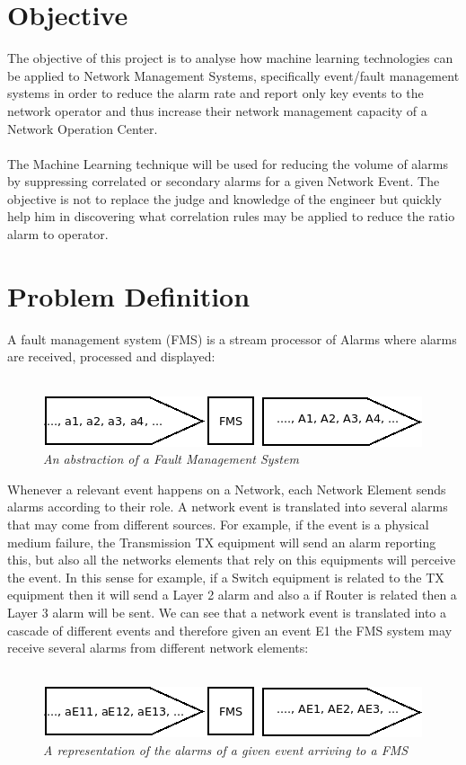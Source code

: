 \documentclass[10pt,a4paper]{article}
\begin{document}
 \section{Objective}
The objective of this project is to analyse how machine learning technologies can be applied to Network Management Systems, specifically event/fault management systems in order to reduce the alarm rate and report only key events to the network operator and thus increase their network management capacity of a Network Operation Center.
\\\\
The Machine Learning technique will be used for reducing the volume of alarms by suppressing correlated or secondary alarms for a given Network Event. The objective is not to replace the judge and knowledge of the engineer but quickly 
help him in discovering what correlation rules may be applied to reduce the ratio alarm to operator.

  \section{Problem Definition}
A fault management system (FMS) is a stream processor of Alarms where alarms are received, processed and displayed:
\\\\
\begin{figure}[H]
 \includegraphics[scale=0.4]{NMS_FMS.png}
  \centering
  \caption{\textit{An abstraction of a Fault Management System}}
  \label{fig:nms_fms}
\end{figure}	

Whenever a relevant event happens on a Network, each Network Element sends alarms according to their role. A network event is translated into several alarms that may come from different sources. For example, if the event is a physical medium failure, the Transmission TX equipment will send an alarm reporting this, but also all the networks elements that rely on this equipments will perceive the event. In this sense for example, if a Switch equipment is related to the TX equipment then it will send a Layer 2 alarm and also a if Router is related then a Layer 3 alarm will be sent. We can see that a network event is translated into a cascade of different events and therefore given an event E1 the FMS system may receive several alarms from different network elements:
\\\\
\begin{figure}[H]
 \includegraphics[scale=0.4]{NMS_FMS_EVENT.png}
  \centering
  \caption{\textit{A representation of the alarms of a given event arriving to a FMS}}
  \label{fig:nms_fms_event}
\end{figure}	
\end{document}
